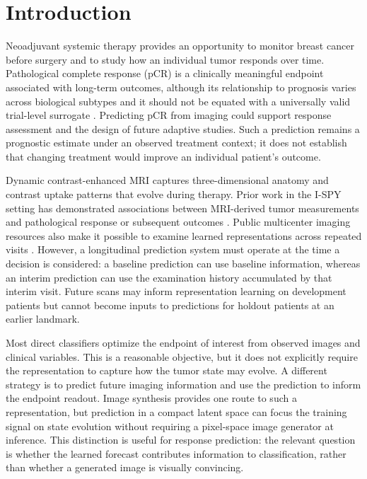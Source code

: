 \section{Introduction}
\label{sec:intro}
Neoadjuvant systemic therapy provides an opportunity to monitor breast cancer before surgery and to study how an individual tumor responds over time. Pathological complete response (pCR) is a clinically meaningful endpoint associated with long-term outcomes, although its relationship to prognosis varies across biological subtypes and it should not be equated with a universally valid trial-level surrogate \citep{ctneobc2014}. Predicting pCR from imaging could support response assessment and the design of future adaptive studies. Such a prediction remains a prognostic estimate under an observed treatment context; it does not establish that changing treatment would improve an individual patient's outcome.

Dynamic contrast-enhanced MRI captures three-dimensional anatomy and contrast uptake patterns that evolve during therapy. Prior work in the I-SPY setting has demonstrated associations between MRI-derived tumor measurements and pathological response or subsequent outcomes \citep{hylton2012mri,hylton2016ftv}. Public multicenter imaging resources also make it possible to examine learned representations across repeated visits \citep{tciaispy2_2022,tciaacrin6698_2021}. However, a longitudinal prediction system must operate at the time a decision is considered: a baseline prediction can use baseline information, whereas an interim prediction can use the examination history accumulated by that interim visit. Future scans may inform representation learning on development patients but cannot become inputs to predictions for holdout patients at an earlier landmark.

Most direct classifiers optimize the endpoint of interest from observed images and clinical variables. This is a reasonable objective, but it does not explicitly require the representation to capture how the tumor state may evolve. A different strategy is to predict future imaging information and use the prediction to inform the endpoint readout. Image synthesis provides one route to such a representation, but prediction in a compact latent space can focus the training signal on state evolution without requiring a pixel-space image generator at inference. This distinction is useful for response prediction: the relevant question is whether the learned forecast contributes information to classification, rather than whether a generated image is visually convincing.

